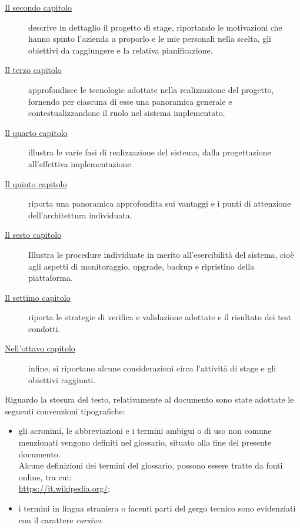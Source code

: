 \begin{description}
    
    \item[{\hyperref[cap:il-progetto]{Il secondo capitolo}}] descrive in dettaglio il progetto di stage, riportando le motivazioni che hanno spinto l'azienda a proporlo e le mie personali nella scelta, gli obiettivi da raggiungere e la relativa pianificazione.
    
    \item[{\hyperref[cap:tecnologie-adottate]{Il terzo capitolo}}] approfondisce le tecnologie adottate nella realizzazione del progetto, fornendo per ciascuna di esse una panoramica generale e contestualizzandone il ruolo nel sistema implementato.
    
    \item[{\hyperref[cap:realizzazione-del-sistema]{Il quarto capitolo}}] illustra le varie fasi di realizzazione del sistema, dalla progettazione all'effettiva implementazione.
    
    \item[{\hyperref[cap:vantaggi-e-punti-di-attenzione]{Il quinto capitolo}}]riporta una panoramica approfondita sui vantaggi e i punti di attenzione dell'architettura individuata.
    
    \item[{\hyperref[cap:esercibilità]{Il sesto capitolo}}]Illustra le procedure individuate in merito all'esercibilità del sistema, cioè agli aspetti di monitoraggio, upgrade, backup e ripristino della piattaforma.
        
    \item[{\hyperref[cap:verifica-validazione]{Il settimo capitolo}}] riporta le strategie di verifica e validazione adottate e il risultato dei test condotti.
    
    \item[{\hyperref[cap:conclusioni]{Nell'ottavo capitolo}}] infine, si riportano alcune considerazioni circa l'attività di stage e gli obiettivi raggiunti.
\end{description}

Riguardo la stesura del testo, relativamente al documento sono state adottate le seguenti convenzioni tipografiche:
\begin{itemize}
	\item gli acronimi, le abbreviazioni e i termini ambigui o di uso non comune menzionati vengono definiti nel glossario, situato alla fine del presente documento. \\
    Alcune definizioni dei termini del glossario, possono essere tratte da fonti online, tra cui: \\ 
    \url{https://it.wikipedia.org/};
	\item i termini in lingua straniera o facenti parti del gergo tecnico sono evidenziati con il carattere \emph{corsivo}.
\end{itemize}